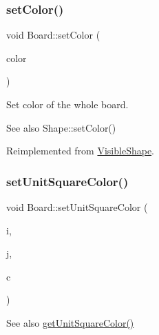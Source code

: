 \subsubsection{\texorpdfstring{set\+Color()}{setColor()}}
{\footnotesize\ttfamily void Board\+::set\+Color (\begin{DoxyParamCaption}\item[{const \mbox{\hyperlink{class_r_g_b_color}{R\+G\+B\+Color}} \&}]{color }\end{DoxyParamCaption})\hspace{0.3cm}{\ttfamily [virtual]}}



Set color of the whole board. 

\begin{DoxySeeAlso}{See also}
Shape\+::set\+Color() 
\end{DoxySeeAlso}


Reimplemented from \mbox{\hyperlink{class_visible_shape_a69ae0940d090fec376bee8dc6861b8dc}{Visible\+Shape}}.

\mbox{\label{class_board_a9c8fc3e645f56bec246a27459f5c75ec}} 
\subsubsection{\texorpdfstring{set\+Unit\+Square\+Color()}{setUnitSquareColor()}}
{\footnotesize\ttfamily void Board\+::set\+Unit\+Square\+Color (\begin{DoxyParamCaption}\item[{const int \&}]{i,  }\item[{const int \&}]{j,  }\item[{const \mbox{\hyperlink{class_r_g_b_color}{R\+G\+B\+Color}} \&}]{c }\end{DoxyParamCaption})\hspace{0.3cm}{\ttfamily [virtual]}}

\begin{DoxySeeAlso}{See also}
\mbox{\hyperlink{class_board_a6e6a947ec66c09bff4559fd9650b9b1d}{get\+Unit\+Square\+Color()}} 
\end{DoxySeeAlso}
\mbox{\label{class_board_aeff7b135ffeea47ce26da75ce670807a}} 
